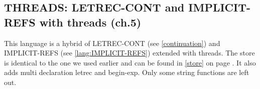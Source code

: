 \documentclass[../codeprint.tex]{subfiles}
\begin{document}
\subsection{THREADS: LETREC-CONT and IMPLICIT-REFS with threads (ch.5)}
This language is a hybrid of LETREC-CONT (see \autoref{continuation}) and IMPLICIT-REFS (see \autoref{lang:IMPLICIT-REFS}) extended with threads. The store is identical to the one we used earlier and can be found in \autoref{store} on page \pageref{store}. It also adds multi declaration letrec and begin-exp. Only some string functions are left out.


\end{document}
